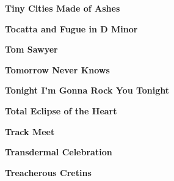 \begin{center}\textbf{Tiny Cities Made of Ashes}\end{center}
\newline
\vspace{10pt} 
\begin{center}\textbf{Tocatta and Fugue in D Minor}\end{center}
\newline
\vspace{10pt} 
\begin{center}\textbf{Tom Sawyer}\end{center}
\newline
\vspace{10pt} 
\begin{center}\textbf{Tomorrow Never Knows}\end{center}
\newline
\vspace{10pt} 
\begin{center}\textbf{Tonight I'm Gonna Rock You Tonight}\end{center}
\newline
\vspace{10pt} 
\begin{center}\textbf{Total Eclipse of the Heart}\end{center}
\newline
\vspace{10pt} 
\begin{center}\textbf{Track Meet}\end{center}
\newline
\vspace{10pt} 
\begin{center}\textbf{Transdermal Celebration}\end{center}
\newline
\vspace{10pt} 
\begin{center}\textbf{Treacherous Cretins}\end{center}
\newline
\vspace{10pt} 
